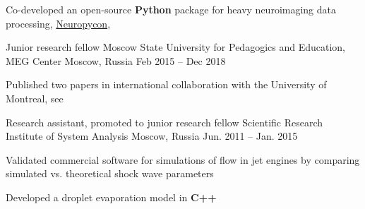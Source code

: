 \begin{cventries}
{\begin{cvitems}
          \item{Co-developed an open-source \textbf{Python} package for heavy neuroimaging data processing, \href{https://github.com/neuropycon}{Neuropycon}, \cite{Neuropycon}}
      \end{cvitems}
    }
  \cventry
    {Junior research fellow}
    {Moscow State University for Pedagogics and Education, MEG Center}
    {Moscow, Russia}
    {Feb 2015 -- Dec 2018}
    {
      \begin{cvitems}
      \item{Published two papers in international collaboration with the University of Montreal, see \cite{Alamian2017a, Alamian2017b}}
      \end{cvitems}
    }
  \cventry
    {Research assistant, promoted to junior research fellow}
    {Scientific Research Institute of System Analysis}
    {Moscow, Russia}
    {Jun. 2011 -- Jan. 2015}
    {
      \begin{cvitems}
        \item{Validated commercial software for simulations of flow in jet engines by comparing simulated vs. theoretical shock wave parameters}
        \item{Developed a droplet evaporation model in \textbf{C++}}
      \end{cvitems}
    }
\end{cventries}
